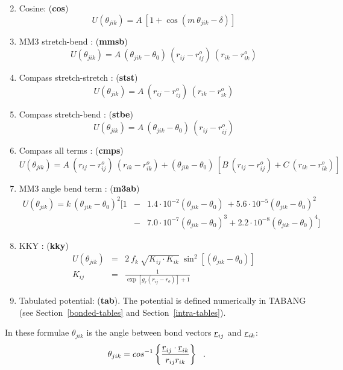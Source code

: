 \begin{enumerate}
\begin{equation}
\end{equation}
\item Cosine:  ({\bf cos})
\begin{equation}
U(\theta_{jik}) = A~[1 + \cos(m~\theta_{jik}-\delta)]
\end{equation}
\item MM3 stretch-bend \cite{allinger-89a}:  ({\bf mmsb})
\begin{equation}
U(\theta_{jik}) = A~(\theta_{jik}-\theta_{0})~(r_{ij} - r_{ij}^{o})~(r_{ik} - r_{ik}^{o})
\end{equation}
\item Compass stretch-stretch \cite{sun-98a}:  ({\bf stst})
\begin{equation}
U(\theta_{jik}) = A~(r_{ij} - r_{ij}^{o})~(r_{ik} - r_{ik}^{o})
\end{equation}
\item Compass stretch-bend \cite{sun-98a}:  ({\bf stbe})
\begin{equation}
U(\theta_{jik}) = A~(\theta_{jik}-\theta_{0})~(r_{ij} - r_{ij}^{o})
\end{equation}
\item Compass all terms \cite{sun-98a}:  ({\bf cmps})
\begin{equation}
U(\theta_{jik}) = A~(r_{ij} - r_{ij}^{o})~(r_{ik} - r_{ik}^{o}) +
(\theta_{jik}-\theta_{0})~[B~(r_{ij} - r_{ij}^{o})+C~(r_{ik} - r_{ik}^{o})]
\end{equation}
\item MM3 angle bend term \cite{allinger-89a}:  ({\bf m3ab})
\begin{eqnarray}
U(\theta_{jik}) = k~(\theta_{jik}-\theta_{0})^{2}[1 &-& 1.4 \cdot 10^{-2}(\theta_{jik}-\theta_{0})^{~}+5.6 \cdot 10^{-5}(\theta_{jik}-\theta_{0})^{2} \nonumber \\
&-& 7.0 \cdot 10^{-7}(\theta_{jik}-\theta_{0})^{3}+2.2 \cdot 10^{-8}(\theta_{jik}-\theta_{0})^{4}]
\end{eqnarray}
\item KKY \cite{kumagai-94a}:  ({\bf kky})
\begin{eqnarray}
U(\theta_{jik}) &=& 2~f_{k}~\sqrt{K_{ij} \cdot K_{ik}}~\sin^{2}\left[(\theta_{jik}-\theta_{0})\right] \nonumber \\
K_{ij} &=& \frac{1}{\exp\left[g_{r}(r_{ij}-r_{o})\right]+1}
\end{eqnarray}
\item Tabulated potential:  ({\bf tab}).  The potential is defined numerically in TABANG (see Section~\ref{bonded-tables} and Section~\ref{intra-tables}).
\end{enumerate}
In these formulae $\theta_{jik}$ is the angle between bond vectors
$\mbox{$\underline{r}$}_{ij}$ and $\mbox{$\underline{r}$}_{ik}$:
\begin{equation}
\theta_{jik}=cos^{-1}\left\{\frac{\mbox{$\underline{r}$}_{ij}\cdot\mbox{$\underline{r}$}_{ik}}
{r_{ij}r_{ik}}\right\}~~.
\end{equation}

